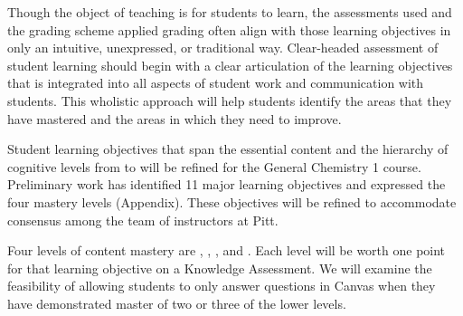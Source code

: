 \documentclass[10pt,letterpaper]{article}
\begin{document}

%
%
Though the object of teaching is for students to learn,  the assessments used and the grading scheme applied grading often align with those learning objectives in only an intuitive, unexpressed, or traditional way. Clear-headed assessment of student learning should begin with a clear articulation of the learning objectives that is integrated into all aspects of student work and communication with students. This wholistic approach will help students identify the areas that they have mastered and the areas in which  they need to improve.

Student learning objectives that span the essential content and the hierarchy of cognitive levels from \recall to \use will be refined for the General Chemistry 1 course. Preliminary work has identified 11 major learning objectives and expressed the four mastery levels (Appendix). These objectives will be refined to accommodate consensus among the team of \pogil instructors at Pitt. 


 Four levels of content mastery are \recall, \comprehension, \analysis, and \use. Each level will be worth one point for that learning objective on a Knowledge Assessment. We will examine the feasibility of allowing students to only answer \use questions in Canvas when they have demonstrated master of two or three of the lower levels. 
\end{document}
